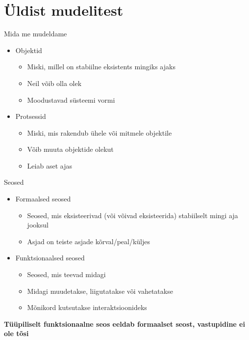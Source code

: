 \documentclass{beamer}
\begin{document}
\section{Üldist mudelitest}

\begin{frame}{Mida me mudeldame}
	\begin{itemize}
		\item Objektid
		\begin{itemize}
			\item Miski, millel on stabiilne eksistents mingiks ajaks
			\item Neil võib olla olek
			\item Moodustavad süsteemi vormi
		\end{itemize}
		\item Protsessid
		\begin{itemize}
			\item Miski, mis rakendub ühele või mitmele objektile
			\item Võib muuta objektide olekut
			\item Leiab aset ajas
		\end{itemize}
	\end{itemize}
\end{frame}

\begin{frame}{Seosed}
	\begin{itemize}
		\item Formaalsed seosed
		\begin{itemize}
			\item Seosed, mis eksisteerivad (või võivad eksisteerida) stabiilselt mingi aja jooksul
			\item Asjad on teiste asjade kõrval/peal/küljes
		\end{itemize}
		\item Funktsionaalsed seosed
		\begin{itemize}
			\item Seosed, mis teevad midagi
			\item Midagi muudetakse, liigutatakse või vahetatakse
			\item Mõnikord kutsutakse interaktsioonideks
		\end{itemize}
	\end{itemize}
	
	\begin{center}
		\textbf{Tüüpiliselt funktsionaalne seos eeldab formaalset seost, vastupidine ei ole tõsi}
	\end{center}
\end{frame}
\end{document}
